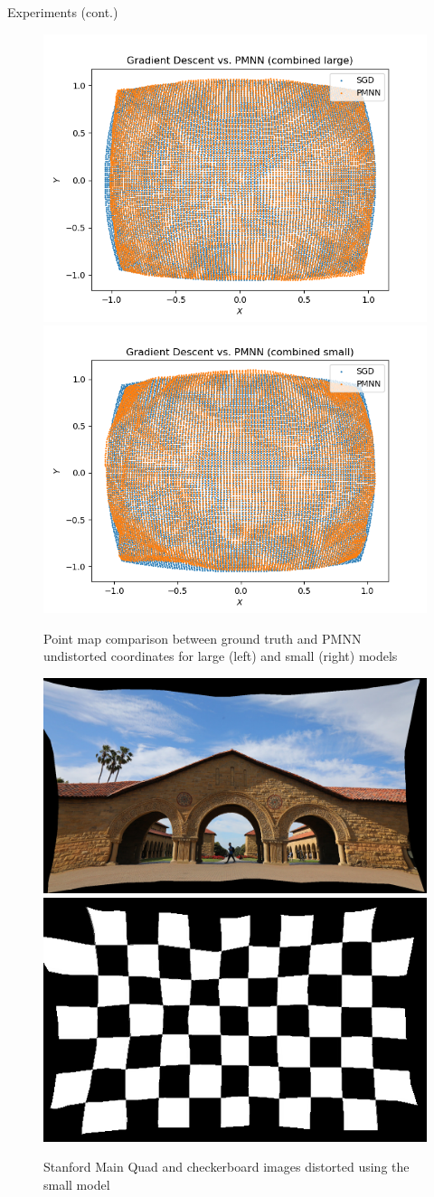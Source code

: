 \documentclass[final,16pt]{beamer}
\newlength{\colwidth}
\begin{document}
\begin{frame}[t]
\begin{columns}[t]
    \begin{column}{\colwidth}
      \begin{block}{Experiments (cont.)}
        \begin{figure}
          \includegraphics[width=0.48\columnwidth]{images/combined_large_pointmap.png}
          \includegraphics[width=0.48\columnwidth]{images/combined_small_pointmap.png}
          \caption{Point map comparison between ground truth and PMNN undistorted coordinates for large (left) and small (right) models}
        \end{figure}

        \begin{figure}
          \includegraphics[width=0.48\columnwidth]{images/combined_stanford.png}
          \includegraphics[width=0.44\columnwidth]{images/combined_checkerboard.png}
          \caption{Stanford Main Quad and checkerboard images distorted using the small model}
        \end{figure}
      \end{block}


\end{column}
\end{columns}
\end{frame}
\end{document}
